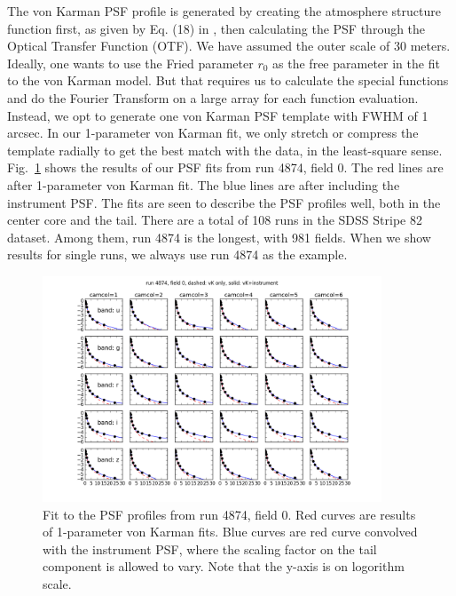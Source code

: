 The von Karman PSF profile is generated by creating the atmosphere
structure function first, as given by Eq. (18) in \cite{Tokovinin2002}, then calculating the
PSF through the Optical Transfer Function (OTF). We have assumed the
outer scale of 30 meters.
Ideally, one wants to use the Fried parameter $r_0$ as the free
parameter in the fit to the von Karman model. 
But that requires us to calculate the special functions and do the
Fourier Transform on a large array for each function evaluation.
Instead, we opt to generate one von Karman PSF template with FWHM of 1
arcsec. In our 1-parameter von Karman fit, we only stretch or compress
the template radially to get the best match with the data, in the
least-square sense.
Fig.~\ref{fig:psffit} shows the results of our PSF fits from run 4874,
field 0. The red lines are after 1-parameter von Karman fit. 
The blue lines are after including the instrument PSF.
The fits are seen to describe the PSF profiles well, both in
the center core and the tail.
There are a total of 108 runs in the SDSS Stripe 82 dataset.
Among them, run 4874 is the longest, with 981 fields. When we show
results for single runs, we always use run 4874 as the example.

\begin{figure}
\centering
\includegraphics[width=0.9\textwidth]{FIGURES/psffit.png}
\caption{Fit to the PSF profiles from run 4874, field 0. Red curves
  are results of 1-parameter von Karman fits. Blue curves are red
  curve convolved with the instrument PSF, where the scaling factor on
  the tail component is allowed to vary. Note that the y-axis is on
  logorithm scale.
\label{fig:psffit}}
\end{figure}
